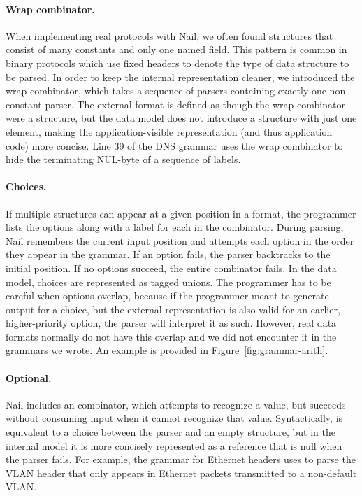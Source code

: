 \paragraph{Wrap combinator.} 
When implementing real protocols with Nail, we often found
structures that consist of many constants and only one named field. This pattern is
common in binary protocols which use fixed headers to denote the type of data
structure to be parsed.  In order to keep the internal representation cleaner,
we introduced the wrap combinator, which takes a sequence of parsers containing
exactly one non-constant parser. The external format is defined as though the wrap combinator were a
structure, but the data model does not introduce a structure with just one element, making the application-visible representation
(and thus application code) more concise.
Line 39 of the DNS grammar uses the wrap combinator to hide the terminating NUL-byte of a sequence
of labels.


\paragraph{Choices.}
If multiple structures can appear at a given position in a format, the programmer lists the options
along with a label for each in the  combinator. 
During parsing, Nail remembers the current input position and attempts each option in the order they
appear in the grammar. If an option fails, the parser backtracks to the initial position. If no
options succeed, the entire combinator fails. In the data model, choices are represented as tagged
unions.  The programmer has to be careful when options overlap, because if the programmer meant to
generate output for a choice, but the external representation is also valid for an earlier,
higher-priority option, the parser will interpret it as such. However, real data formats normally do
not have this overlap and we did not encounter it in the grammars we wrote.
An example is provided in Figure~\ref{fig:grammar-arith}.



\paragraph{Optional.}
Nail includes an  combinator, which attempts to recognize a value, but succeeds
without consuming input when it cannot recognize that value. Syntactically,  is
equivalent to a choice between the parser and an empty structure, but in the internal model it is
more concisely represented as a reference that is null when the parser fails.
For example, the grammar for  Ethernet headers uses  to parse the VLAN
header that only appears in Ethernet packets transmitted to a non-default VLAN\@.

